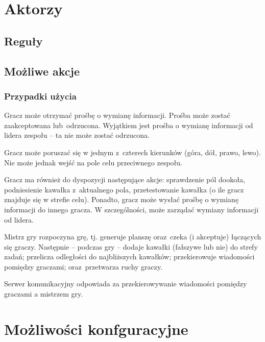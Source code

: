 \documentclass[a4paper]{article}
\begin{document}
\section{Aktorzy}


\subsection{Reguły}


\subsection{Możliwe akcje}


\subsubsection{Przypadki użycia}


Gracz może otrzymać prośbę o wymianę informacji.
Prośba może zostać zaakceptowana lub~odrzucona.
Wyjątkiem jest prośba o wymianę informacji od lidera zespołu -- ta nie może zostać odrzucona.

Gracz może poruszać się w jednym z~czterech kierunków (góra, dół, prawo, lewo).
Nie może jednak wejść na pole celu przeciwnego zespołu.

Gracz ma również do dyspozycji następujące akcje: sprawdzenie pól dookoła, podniesienie kawałka z~aktualnego pola, przetestowanie kawałka (o ile gracz znajduje się w strefie celu).
Ponadto, gracz może wysłać prośbę o wymianę informacji do innego gracza.
W szczególności, może zarządać wymiany informacji od lidera.



Mistrz gry rozpoczyna grę, tj. generuje planszę oraz~czeka (i akceptuje) łączących się graczy.
Następnie -- podczas gry -- dodaje kawałki (fałszywe lub nie) do strefy zadań; przelicza odległości do najbliższych kawałków; przekierowuje wiadomości pomiędzy graczami; oraz~przetwarza ruchy graczy.



Serwer komunikacyjny odpowiada za przekierowywanie wiadomości pomiędzy graczami a mistrzem gry.

\section{Możliwości konfguracyjne}
\end{document}
